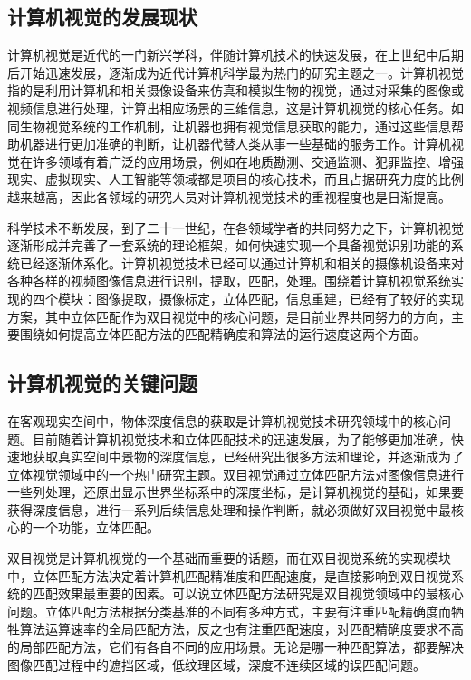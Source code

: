 \subsection{计算机视觉的发展现状}

计算机视觉是近代的一门新兴学科，伴随计算机技术的快速发展，在上世纪中后期后开始迅速发展，逐渐成为近代计算机科学最为热门的研究主题之一。计算机视觉指的是利用计算机和相关摄像设备来仿真和模拟生物的视觉，通过对采集的图像或视频信息进行处理，计算出相应场景的三维信息，这是计算机视觉的核心任务。如同生物视觉系统的工作机制，让机器也拥有视觉信息获取的能力，通过这些信息帮助机器进行更加准确的判断，让机器代替人类从事一些基础的服务工作。计算机视觉在许多领域有着广泛的应用场景，例如在地质勘测、交通监测、犯罪监控、增强现实、虚拟现实、人工智能等领域都是项目的核心技术，而且占据研究力度的比例越来越高，因此各领域的研究人员对计算机视觉技术的重视程度也是日渐提高。

科学技术不断发展，到了二十一世纪，在各领域学者的共同努力之下，计算机视觉逐渐形成并完善了一套系统的理论框架，如何快速实现一个具备视觉识别功能的系统已经逐渐体系化。计算机视觉技术已经可以通过计算机和相关的摄像机设备来对各种各样的视频图像信息进行识别，提取，匹配，处理。围绕着计算机视觉系统实现的四个模块：图像提取，摄像标定，立体匹配，信息重建，已经有了较好的实现方案，其中立体匹配作为双目视觉中的核心问题，是目前业界共同努力的方向，主要围绕如何提高立体匹配方法的匹配精确度和算法的运行速度这两个方面。

\subsection{计算机视觉的关键问题}

在客观现实空间中，物体深度信息的获取是计算机视觉技术研究领域中的核心问题。目前随着计算机视觉技术和立体匹配技术的迅速发展，为了能够更加准确，快速地获取真实空间中景物的深度信息，已经研究出很多方法和理论，并逐渐成为了立体视觉领域中的一个热门研究主题。双目视觉通过立体匹配方法对图像信息进行一些列处理，还原出显示世界坐标系中的深度坐标，是计算机视觉的基础，如果要获得深度信息，进行一系列后续信息处理和操作判断，就必须做好双目视觉中最核心的一个功能，立体匹配。 

双目视觉是计算机视觉的一个基础而重要的话题，而在双目视觉系统的实现模块中，立体匹配方法决定着计算机匹配精准度和匹配速度，是直接影响到双目视觉系统的匹配效果最重要的因素。可以说立体匹配方法研究是双目视觉领域中的最核心问题。立体匹配方法根据分类基准的不同有多种方式，主要有注重匹配精确度而牺牲算法运算速率的全局匹配方法，反之也有注重匹配速度，对匹配精确度要求不高的局部匹配方法，它们有各自不同的应用场景。无论是哪一种匹配算法，都要解决图像匹配过程中的遮挡区域，低纹理区域，深度不连续区域的误匹配问题。


